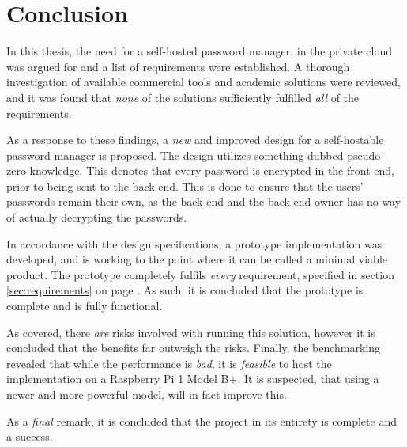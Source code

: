 \chapter{Conclusion}
	In this thesis, the need for a self-hosted password manager, in the private cloud was argued for and a list of requirements were established. A thorough investigation of available commercial tools and academic solutions were reviewed, and it was found that \emph{none} of the solutions sufficiently fulfilled \emph{all} of the requirements.

	As a response to these findings, a \emph{new} and improved design for a self-hostable password manager is proposed. The design utilizes something dubbed pseudo-zero-knowledge. This denotes that every password is encrypted in the front-end, prior to being sent to the back-end. This is done to ensure that the users' passwords remain their own, as the back-end and the back-end owner has no way of actually decrypting the passwords.

	In accordance with the design specifications, a prototype implementation was developed, and is working to the point where it can be called a minimal viable product. The prototype completely fulfils \emph{every} requirement, specified in section \ref{sec:requirements} on page \pageref{sec:requirements}. As such, it is concluded that the prototype is complete and is fully functional.

	As covered, there \emph{are} risks involved with running this solution, however it is concluded that the benefits far outweigh the risks. Finally, the benchmarking revealed that while the performance is \emph{bad}, it is \emph{feasible} to host the implementation on a Raspberry Pi 1 Model B+. It is suspected, that using a newer and more powerful model, will in fact improve this. 

	As a \emph{final} remark, it is concluded that the project in its entirety is complete and a success.
